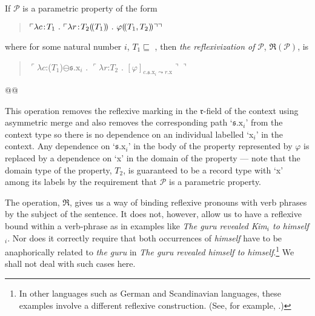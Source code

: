 \begin{ex} 
  If $\mathcal{P}$ is a parametric property of the form
  \begin{quote}
    $\ulcorner\lambda c\!:\!T_1\ .\ \ulcorner\lambda
    r\!:\!T_2\dep{T_1}\ .\ \varphi\dep{T_1,T_2}\urcorner\urcorner$
  \end{quote}
  where for some natural number $i$, $T_1\sqsubseteq$ , then \textit{the reflexivization
  of} $\mathcal{P}$, $\mathfrak{R}(\mathcal{P})$, is
  \begin{quote}
    $\ulcorner\lambda c$:($T_1$\fbox{\d{$\wedge$}})$\ominus\mathfrak{s}.\text{x}_i$
    . $\ulcorner\lambda r$:$T_2$
    . $[\varphi]_{c.\mathfrak{s}.\text{x}_i\leadsto
      r.\text{x}}\urcorner\urcorner$
  \end{quote}
  
\end{ex}

@@


This operation removes the reflexive marking in the
$\mathfrak{r}$-field of the context using asymmetric merge and also
removes the corresponding path `$\mathfrak{s}.\text{x}_i$' from the
context type so there is no dependence on an individual labelled
`x$_i$' in the context.  Any dependence on `$\mathfrak{s}$.x$_i$' in
the body of the property represented by $\varphi$ is replaced by a
dependence on `x' in the domain of the property --- note that the
domain type of the property, $T_2$, is guaranteed to be a record type
with `x' among its labels by the requirement that $\mathcal{P}$ is a
parametric property.

The operation, $\mathfrak{R}$, gives us a way of binding reflexive
pronouns with verb phrases by the subject of the sentence.  It does
not, however, allow us to have a reflexive bound within a verb-phrase
as in examples like \textit{The guru revealed Kim$_i$ to
  himself$_i$}.  Nor does it correctly require that both occurrences
of \textit{himself} have to be anaphorically related to \textit{the
  guru} in \textit{The guru revealed himself to himself}.\footnote{In
  other languages such as German and Scandinavian languages, these
  examples involve a different reflexive construction.  (See, for
  example, \citealp{Hellan1986}.)}  We shall not deal with such cases
here.

